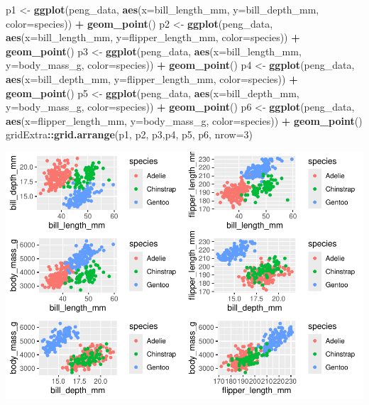 \documentclass[
]{article}
\newenvironment{Shaded}{\begin{snugshade}}{\end{snugshade}}
\newcommand{\AttributeTok}[1]{\textcolor[rgb]{0.13,0.29,0.53}{#1}}
\newcommand{\DecValTok}[1]{\textcolor[rgb]{0.00,0.00,0.81}{#1}}
\newcommand{\FunctionTok}[1]{\textcolor[rgb]{0.13,0.29,0.53}{\textbf{#1}}}
\newcommand{\NormalTok}[1]{#1}
\newcommand{\OtherTok}[1]{\textcolor[rgb]{0.56,0.35,0.01}{#1}}
\newcommand{\SpecialCharTok}[1]{\textcolor[rgb]{0.81,0.36,0.00}{\textbf{#1}}}
\begin{document}
\begin{Shaded}
\begin{Highlighting}[]
\NormalTok{p1 }\OtherTok{\textless{}{-}} \FunctionTok{ggplot}\NormalTok{(peng\_data, }\FunctionTok{aes}\NormalTok{(}\AttributeTok{x=}\NormalTok{bill\_length\_mm, }\AttributeTok{y=}\NormalTok{bill\_depth\_mm, }\AttributeTok{color=}\NormalTok{species)) }\SpecialCharTok{+}
  \FunctionTok{geom\_point}\NormalTok{()}
\NormalTok{p2 }\OtherTok{\textless{}{-}} \FunctionTok{ggplot}\NormalTok{(peng\_data, }\FunctionTok{aes}\NormalTok{(}\AttributeTok{x=}\NormalTok{bill\_length\_mm, }\AttributeTok{y=}\NormalTok{flipper\_length\_mm, }\AttributeTok{color=}\NormalTok{species)) }\SpecialCharTok{+}
  \FunctionTok{geom\_point}\NormalTok{()}
\NormalTok{p3 }\OtherTok{\textless{}{-}} \FunctionTok{ggplot}\NormalTok{(peng\_data, }\FunctionTok{aes}\NormalTok{(}\AttributeTok{x=}\NormalTok{bill\_length\_mm, }\AttributeTok{y=}\NormalTok{body\_mass\_g, }\AttributeTok{color=}\NormalTok{species)) }\SpecialCharTok{+}
  \FunctionTok{geom\_point}\NormalTok{()}
\NormalTok{p4 }\OtherTok{\textless{}{-}} \FunctionTok{ggplot}\NormalTok{(peng\_data, }\FunctionTok{aes}\NormalTok{(}\AttributeTok{x=}\NormalTok{bill\_depth\_mm, }\AttributeTok{y=}\NormalTok{flipper\_length\_mm, }\AttributeTok{color=}\NormalTok{species)) }\SpecialCharTok{+}
  \FunctionTok{geom\_point}\NormalTok{()}
\NormalTok{p5 }\OtherTok{\textless{}{-}} \FunctionTok{ggplot}\NormalTok{(peng\_data, }\FunctionTok{aes}\NormalTok{(}\AttributeTok{x=}\NormalTok{bill\_depth\_mm, }\AttributeTok{y=}\NormalTok{body\_mass\_g, }\AttributeTok{color=}\NormalTok{species)) }\SpecialCharTok{+}
  \FunctionTok{geom\_point}\NormalTok{()}
\NormalTok{p6 }\OtherTok{\textless{}{-}} \FunctionTok{ggplot}\NormalTok{(peng\_data, }\FunctionTok{aes}\NormalTok{(}\AttributeTok{x=}\NormalTok{flipper\_length\_mm, }\AttributeTok{y=}\NormalTok{body\_mass\_g, }\AttributeTok{color=}\NormalTok{species)) }\SpecialCharTok{+}
  \FunctionTok{geom\_point}\NormalTok{()}
\NormalTok{gridExtra}\SpecialCharTok{::}\FunctionTok{grid.arrange}\NormalTok{(p1, p2, p3,p4, p5, p6, }\AttributeTok{nrow=}\DecValTok{3}\NormalTok{)}
\end{Highlighting}
\end{Shaded}

\includegraphics{EDA_files/figure-latex/unnamed-chunk-34-1.pdf}
\end{document}
